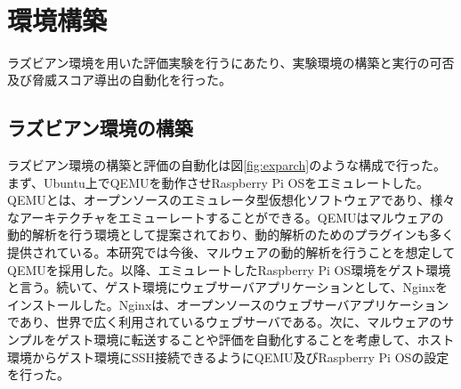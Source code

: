 \documentclass[12pt,a4paper,titlepage,report]{jsbook}
\begin{document}
\begin{table}[htbp]
	\caption{マルウェアの分類と脅威スコアの対応表}
	\label{tab:typescore}
	\centering
	\\
\end{table}

\section{環境構築}
\label{環境構築}
ラズビアン環境を用いた評価実験を行うにあたり、実験環境の構築と実行の可否及び脅威スコア導出の自動化を行った。

\subsection{ラズビアン環境の構築}
ラズビアン環境の構築と評価の自動化は図\ref{fig:exparch}のような構成で行った。まず、Ubuntu上でQEMUを動作させRaspberry Pi OSをエミュレートした。QEMUとは、オープンソースのエミュレータ型仮想化ソフトウェアであり、様々なアーキテクチャをエミューレートすることができる。QEMUはマルウェアの動的解析を行う環境として提案されており、動的解析のためのプラグイン\cite{panda}も多く提供されている。本研究では今後、マルウェアの動的解析を行うことを想定してQEMUを採用した。以降、エミュレートしたRaspberry Pi OS環境をゲスト環境と言う。続いて、ゲスト環境にウェブサーバアプリケーションとして、Nginxをインストールした。Nginxは、オープンソースのウェブサーバアプリケーションであり、世界で広く利用されているウェブサーバである。次に、マルウェアのサンプルをゲスト環境に転送することや評価を自動化することを考慮して、ホスト環境からゲスト環境にSSH接続できるようにQEMU及びRaspberry Pi OSの設定を行った。
\end{document}
